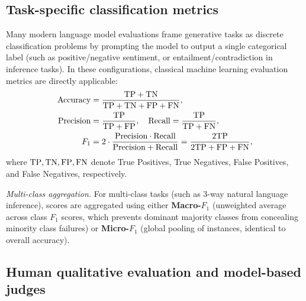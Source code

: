 \documentclass[../../main.tex]{subfiles}
\begin{document}
\subsection{Task-specific classification metrics}
\label{subsec:classification_metrics}

Many modern language model evaluations frame generative tasks as discrete classification problems by prompting the model to output a single categorical label (such as positive/negative sentiment, or entailment/contradiction in inference tasks). In these configurations, classical machine learning evaluation metrics are directly applicable:
\begin{align}
\label{eq:accuracy_def}
\text{Accuracy} &= \frac{\mathrm{TP} + \mathrm{TN}}{\mathrm{TP} + \mathrm{TN} + \mathrm{FP} + \mathrm{FN}}, \\
\label{eq:precision_class_def}
\text{Precision} &= \frac{\mathrm{TP}}{\mathrm{TP} + \mathrm{FP}}, \quad \text{Recall} = \frac{\mathrm{TP}}{\mathrm{TP} + \mathrm{FN}}, \\
\label{eq:f1_class_def}
F_1 &= 2 \cdot \frac{\text{Precision} \cdot \text{Recall}}{\text{Precision} + \text{Recall}} = \frac{2 \mathrm{TP}}{2 \mathrm{TP} + \mathrm{FP} + \mathrm{FN}},
\end{align}
where $\mathrm{TP}, \mathrm{TN}, \mathrm{FP}, \mathrm{FN}$ denote True Positives, True Negatives, False Positives, and False Negatives, respectively.

\textit{Multi-class aggregation.} For multi-class tasks (such as 3-way natural language inference), scores are aggregated using either \textbf{Macro-$F_1$} (unweighted average across class $F_1$ scores, which prevents dominant majority classes from concealing minority class failures) or \textbf{Micro-$F_1$} (global pooling of instances, identical to overall accuracy).

\subsection{Human qualitative evaluation and model-based judges}
\label{subsec:human_eval_judges}
\end{document}
